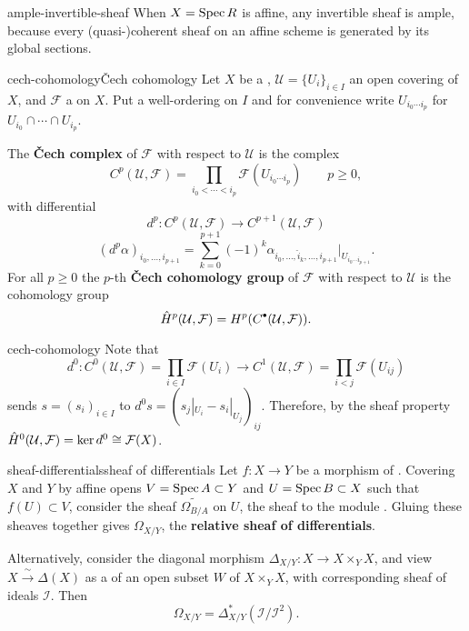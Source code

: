 \begin{example}{ample-invertible-sheaf}
    When $X = \operatorname{Spec} R$ is affine, any invertible sheaf is ample, because every (quasi-)coherent sheaf on an affine scheme is generated by its global sections.
\end{example}

\begin{topic}{cech-cohomology}{Čech cohomology}
    Let $X$ be a , $\mathcal{U} = \{ U_i \}_{i \in I}$ an open covering of $X$, and $\mathcal{F}$ a  on $X$. Put a well-ordering on $I$ and for convenience write $U_{i_0 \cdots i_p}$ for $U_{i_0} \cap \cdots \cap U_{i_p}$.
    
    The \textbf{Čech complex} of $\mathcal{F}$ with respect to $\mathcal{U}$ is the complex
    \[ C^p(\mathcal{U}, \mathcal{F}) = \prod_{i_0 < \cdots < i_p} \mathcal{F}(U_{i_0 \cdots i_p}) \qquad p \ge 0 , \]
    with differential
    \[ d^p : C^p(\mathcal{U}, \mathcal{F}) \to C^{p + 1}(\mathcal{U}, \mathcal{F}) \]
    \[ (d^p \alpha)_{i_0 , \ldots , i_{p + 1}} = \sum_{k = 0}^{p + 1} (-1)^k \alpha_{i_0 , \ldots , \hat{i}_k, \ldots, i_{p + 1}} | _{U_{i_0 \cdots i_{p + 1}}} . \]
    For all $p \ge 0$ the $p$-th \textbf{Čech cohomology group} of $\mathcal{F}$ with respect to $\mathcal{U}$ is the cohomology group
    \[ \hat{H}^p(\mathcal{U}, \mathcal{F}) = H^p(C^\bdot(\mathcal{U}, \mathcal{F})) . \]
\end{topic}

\begin{example}{cech-cohomology}
    Note that 
    \[ d^0 : C^0(\mathcal{U}, \mathcal{F}) = \prod_{i \in I} \mathcal{F}(U_i) \to C^1(\mathcal{U}, \mathcal{F}) = \prod_{i < j} \mathcal{F}(U_{ij}) \]
    sends $s = (s_i)_{i \in I}$ to $d^0 s = \left(s_j|_{U_i} - s_i|_{U_j}\right)_{ij}$. Therefore, by the sheaf property $\hat{H}^0(\mathcal{U}, \mathcal{F}) = \ker d^0 \cong \mathcal{F}(X)$.
\end{example}

\begin{topic}{sheaf-differentials}{sheaf of differentials}
    Let $f : X \to Y$ be a morphism of . Covering $X$ and $Y$ by affine opens $V = \operatorname{Spec} A \subset Y$ and $U = \operatorname{Spec} B \subset X$ such that $f(U) \subset V$, consider the sheaf $\widetilde{\Omega_{B/A}}$ on $U$, the sheaf  to the module . Gluing these sheaves together gives $\Omega_{X/Y}$, the \textbf{relative sheaf of differentials}.
    
    Alternatively, consider the diagonal morphism $\Delta_{X/Y} : X \to X \times_Y X$, and view $X \xrightarrow{\sim{}} \Delta(X)$ as a  of an open subset $W$ of $X \times_Y X$, with corresponding sheaf of ideals $\mathcal{I}$. Then
    \[ \Omega_{X/Y} = \Delta_{X/Y}^*(\mathcal{I}/\mathcal{I}^2) . \]
\end{topic}

